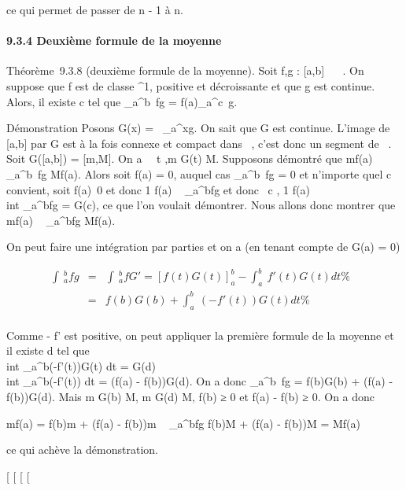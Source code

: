 \documentclass[]{article}
\begin{document}
ce qui permet de passer de n - 1 à n.

\paragraph{9.3.4 Deuxième formule de la moyenne}

Théorème~9.3.8 (deuxième formule de la moyenne). Soit f,g : [a,b] \rightarrow~
~. On suppose que f est de classe ^1, positive et
décroissante et que g est continue. Alors, il existe c \in [a,b] tel
que \int  _a^b~fg =
f(a)\int  _a^c~g.

Démonstration Posons G(x) =\int ~
_a^xg. On sait que G est continue. L'image de [a,b]
par G est à la fois connexe et compact dans ~, c'est donc un segment de
~. Soit G([a,b]) = [m,M]. On a \forall~~t \in
[a,b],m \leq G(t) \leq M. Supposons démontré que mf(a)
\leq\int  _a^b~fg \leq Mf(a). Alors soit
f(a) = 0, auquel cas \int  _a^b~fg
= 0 et n'importe quel c convient, soit f(a)\neq~0
et donc  1 \over f(a) \int ~
_a^bfg \in [m,M] et donc \exists~c \in
[a,b], 1 \over f(a) \\int
 _a^bfg = G(c), ce que l'on voulait démontrer. Nous
allons donc montrer que mf(a) \leq\int ~
_a^bfg \leq Mf(a).

On peut faire une intégration par parties et on a (en tenant compte de
G(a) = 0)

\begin{align*} \int ~
_a^bfg& =& \int ~
_a^bfG' = \left
[f(t)G(t)\right ]_ a^b
-\int  _a^b~f'(t)G(t) dt\%&
\\ & =& f(b)G(b)
+\int  _a^b~(-f'(t))G(t) dt \%&
\\ \end{align*}

Comme - f' est positive, on peut appliquer la première formule de la
moyenne et il existe d \in [a,b] tel que \\int
 _a^b(-f'(t))G(t) dt = G(d)\\int
 _a^b(-f'(t)) dt = (f(a) - f(b))G(d). On a donc
\int  _a^b~fg = f(b)G(b) + (f(a) -
f(b))G(d). Mais m \leq G(b) \leq M, m \leq G(d) \leq M, f(b) ≥ 0 et f(a) - f(b) ≥ 0.
On a donc

mf(a) = f(b)m + (f(a) - f(b))m \leq\int ~
_a^bfg \leq f(b)M + (f(a) - f(b))M = Mf(a)

ce qui achève la démonstration.

[
[
[
[
\end{document}
